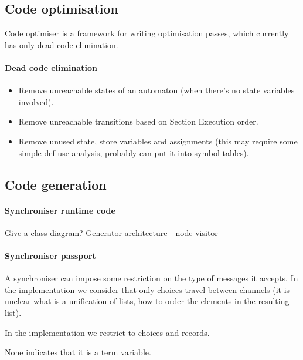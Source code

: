 \subsection{Code optimisation}
Code optimiser is a framework for writing optimisation passes, which currently has only dead code elimination. 

  \paragraph{Dead code elimination}
\begin{itemize}
\item Remove unreachable states of an automaton (when there's no state variables involved).

\item Remove unreachable transitions based on Section Execution order.

\item Remove unused state, store variables and assignments (this may require some simple def-use analysis, probably can put it into symbol tables).
\end{itemize}


\subsection{Code generation}
  \paragraph{Synchroniser runtime code}
Give a class diagram?
Generator architecture - node visitor

  \paragraph{Synchroniser passport}
A synchroniser can impose some restriction on the type of messages it accepts.
In the implementation we consider that only choices travel between channels (it is unclear what is a unification of lists, how to order the elements in the resulting list).

In the implementation we restrict to choices and records.

None indicates that it is a term variable.

